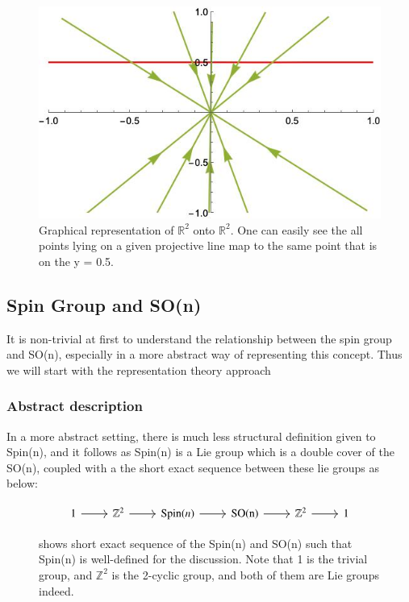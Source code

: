 \documentclass{article}
\begin{document}
\begin{figure}[h!]
\begin{center}
  \includegraphics[scale=0.4]{Figures/n=2proj.jpeg}
\end{center}
  \caption{Graphical representation of $\mathbb{R}^2$ onto $\mathbb{R}^2$. One can easily see the all points lying on a given projective line map to the same point that is on the y = 0.5.}
  
  \label{fig:n=2proj}
\end{figure}


\subsection{Spin Group and SO(n)}%
  \label{sub: double cover of Spin Group}
It is non-trivial at first to understand the relationship between the spin group
and SO(n), especially in a more abstract way of representing this concept.
Thus we will start with the representation theory approach

\subsubsection{Abstract description}%
  \label{sub: abstract description of Spin Group and SO(n)}

  In a more abstract setting, there is much less structural
  definition given to Spin(n), and it follows as Spin(n) is a Lie 
  group which is a double cover of the SO(n), coupled with a 
  the short exact sequence between these lie groups as below:
  \\
\begin{figure}[h!]
\begin{center}
    \[ \begin{tikzcd}
      1 \arrow{r} & \mathbb{Z}^2 \arrow{r} & \text{Spin}(n) \arrow{r}
      & \text{SO(n)}
      \arrow{r} & \mathbb{Z}^2 \arrow{r} & 1
\end{tikzcd}
\]
\end{center}
  \caption{shows short exact sequence of the Spin(n) and SO(n) such that
  Spin(n) is well-defined for the discussion. Note that 1 is the trivial
group, and $\mathbb{Z}^2$ is the 2-cyclic group, and both of them are Lie groups
  indeed.}
\label{name: short sequence diagram for Spin Group}
\end{figure}
\end{document}
